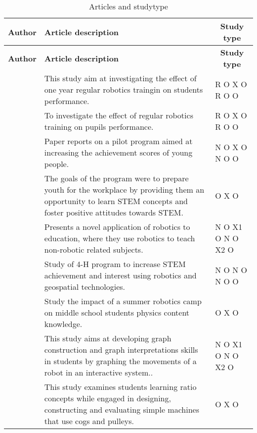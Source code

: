 \setlength\LTleft{0px}
\setlength\LTright{0px}
\begin{longtable}{@{\extracolsep{\fill}}p{}p{}p{}}
	\hline \multicolumn{1}{l}{\textbf{Author}} & \multicolumn{1}{l}{\textbf{Article description}} & \multicolumn{1}{c}{\textbf{Study type	}} \\ \hline\hline
	\endfirsthead
	
	\hline
	\multicolumn{1}{l}{\textbf{Author}} & \multicolumn{1}{l}{\textbf{Article description}} & \multicolumn{1}{c}{\textbf{Study type	}} \\ \hline\hline
	\endhead
	
	\hline
	\caption{Articles and studytype}
	\label{tab:type}
	\endlastfoot
	\tcite{hussain2006effect} & This study aim at investigating the effect of one year regular robotics traingin on students performance. & R O X O R O O\\\hline
	\tcite{lindh2007does} & To investigate the effect of regular robotics training on pupils performance. & R O X O R O O\\\hline
	\tcite{barker2007robotics}& Paper reports on a pilot program aimed at increasing the achievement scores of young people. & N O X O N O O\\\hline
	\tcite{nugent2009use} & The goals of the program were to prepare youth for the workplace by providing them an opportunity to learn STEM concepts and foster positive attitudes towards STEM. & O X O\\\hline
	\tcite{mitnik2008autonomous} & Presents a novel application of robotics to education, where they use robotics to teach non-robotic related subjects. & N O X1 O N O X2 O\\\hline
	\tcite{nugent2008effect} & Study of 4-H program to increase STEM achievement and interest using robotics and geospatial technologies. & N O N O N O O\\\hline
	\tcite{williams2007acquisition} & Study the impact of a summer robotics camp on middle school students physics content knowledge.  & O X O\\\hline
	\tcite{mitnik2009collaborative} & This study aims at developing graph construction and graph interpretations skills in students by graphing the movements of a robot in an interactive system..  & N O X1 O N O X2 O\\\hline
	\tcite{norton2004using} & This study examines students learning ratio concepts while engaged in designing, constructing and evaluating simple machines that use cogs and pulleys.  & O X O\\\hline

\end{longtable}
